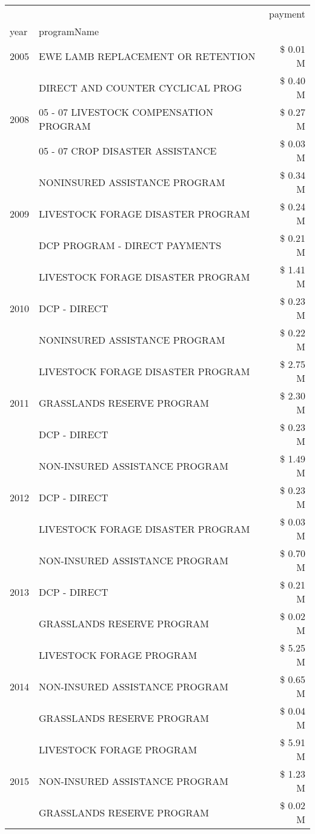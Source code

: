 \begin{tabular}{llr}
\toprule
 &  & payment \\
year & programName &  \\
\midrule
2005 & EWE LAMB REPLACEMENT OR RETENTION & \$ 0.01 M \\
\cline{1-3}
\multirow[t]{3}{*}{2008} & DIRECT AND COUNTER CYCLICAL PROG & \$ 0.40 M \\
 & 05 - 07 LIVESTOCK COMPENSATION PROGRAM & \$ 0.27 M \\
 & 05 - 07 CROP DISASTER ASSISTANCE & \$ 0.03 M \\
\cline{1-3}
\multirow[t]{3}{*}{2009} & NONINSURED ASSISTANCE PROGRAM & \$ 0.34 M \\
 & LIVESTOCK FORAGE DISASTER  PROGRAM & \$ 0.24 M \\
 & DCP PROGRAM - DIRECT PAYMENTS & \$ 0.21 M \\
\cline{1-3}
\multirow[t]{3}{*}{2010} & LIVESTOCK FORAGE DISASTER PROGRAM & \$ 1.41 M \\
 & DCP - DIRECT & \$ 0.23 M \\
 & NONINSURED ASSISTANCE PROGRAM & \$ 0.22 M \\
\cline{1-3}
\multirow[t]{3}{*}{2011} & LIVESTOCK FORAGE DISASTER PROGRAM & \$ 2.75 M \\
 & GRASSLANDS RESERVE PROGRAM & \$ 2.30 M \\
 & DCP - DIRECT & \$ 0.23 M \\
\cline{1-3}
\multirow[t]{3}{*}{2012} & NON-INSURED ASSISTANCE PROGRAM & \$ 1.49 M \\
 & DCP - DIRECT & \$ 0.23 M \\
 & LIVESTOCK FORAGE DISASTER PROGRAM & \$ 0.03 M \\
\cline{1-3}
\multirow[t]{3}{*}{2013} & NON-INSURED ASSISTANCE PROGRAM & \$ 0.70 M \\
 & DCP - DIRECT & \$ 0.21 M \\
 & GRASSLANDS RESERVE PROGRAM & \$ 0.02 M \\
\cline{1-3}
\multirow[t]{3}{*}{2014} & LIVESTOCK FORAGE PROGRAM & \$ 5.25 M \\
 & NON-INSURED ASSISTANCE PROGRAM & \$ 0.65 M \\
 & GRASSLANDS RESERVE PROGRAM & \$ 0.04 M \\
\cline{1-3}
\multirow[t]{3}{*}{2015} & LIVESTOCK FORAGE PROGRAM & \$ 5.91 M \\
 & NON-INSURED ASSISTANCE PROGRAM & \$ 1.23 M \\
 & GRASSLANDS RESERVE PROGRAM & \$ 0.02 M \\

\end{tabular}
